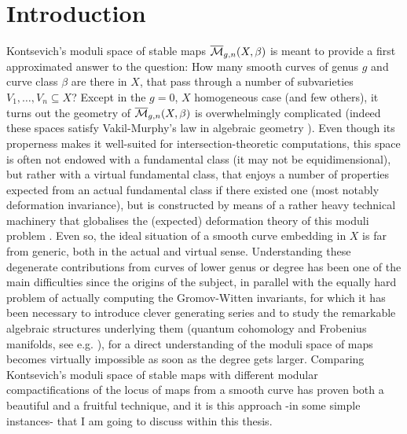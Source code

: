 

\chapter*{Introduction}
Kontsevich's moduli space of stable maps $\overline{\mathcal{M}}_{g,n}(X,\beta)$ \cite{KON} is meant to provide a first approximated answer to the question: How many smooth curves of genus $g$ and curve class $\beta$ are there in $X$, that pass through a number of subvarieties $V_1,\ldots,V_n\subseteq X$? Except in the $g=0$, $X$ homogeneous case (and few others), it turns out the geometry of $\overline{\mathcal{M}}_{g,n}(X,\beta)$ is overwhelmingly complicated (indeed these spaces satisfy Vakil-Murphy's law in algebraic geometry \cite{VakilMurphy}). Even though its properness makes it well-suited for intersection-theoretic computations, this space is often not endowed with a fundamental class (it may not be equidimensional), but rather with a virtual fundamental class, that enjoys a number of properties expected from an actual fundamental class if there existed one (most notably deformation invariance), but is constructed by means of a rather heavy technical machinery that globalises the (expected) deformation theory of this moduli problem \cites{LiTian,BF}. Even so, the ideal situation of a smooth curve embedding in $X$ is far from generic, both in the actual and virtual sense. Understanding these degenerate contributions from curves of lower genus or degree has been one of the main difficulties since the origins of the subject, in parallel with the equally hard problem of actually computing the Gromov-Witten invariants, for which it has been necessary to introduce clever generating series and to study the remarkable algebraic structures underlying them (quantum cohomology and Frobenius manifolds, see e.g. \cite{ManinFrobenius}), for a direct understanding of the moduli space of maps becomes virtually impossible as soon as the degree gets larger. Comparing Kontsevich's moduli space of stable maps with different modular compactifications of the locus of maps from a smooth curve has proven both a beautiful and a fruitful technique, and it is this approach -in some simple instances- that I am going to discuss within this thesis.


